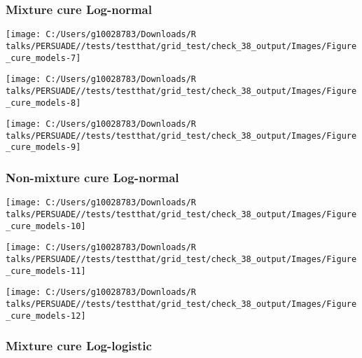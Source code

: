 \documentclass[
]{article}
\begin{document}
\subsubsection{Mixture cure Log-normal}\label{mixture-cure-log-normal}

\begin{flushleft}\texttt{[image: C:/Users/g10028783/Downloads/R talks/PERSUADE//tests/testthat/grid\_test/check\_38\_output/Images/Figure\_cure\_models-7]} \end{flushleft}

\begin{flushleft}\texttt{[image: C:/Users/g10028783/Downloads/R talks/PERSUADE//tests/testthat/grid\_test/check\_38\_output/Images/Figure\_cure\_models-8]} \end{flushleft}

\begin{flushleft}\texttt{[image: C:/Users/g10028783/Downloads/R talks/PERSUADE//tests/testthat/grid\_test/check\_38\_output/Images/Figure\_cure\_models-9]} \end{flushleft}

\clearpage

\subsubsection{Non-mixture cure
Log-normal}\label{non-mixture-cure-log-normal}

\begin{flushleft}\texttt{[image: C:/Users/g10028783/Downloads/R talks/PERSUADE//tests/testthat/grid\_test/check\_38\_output/Images/Figure\_cure\_models-10]} \end{flushleft}

\begin{flushleft}\texttt{[image: C:/Users/g10028783/Downloads/R talks/PERSUADE//tests/testthat/grid\_test/check\_38\_output/Images/Figure\_cure\_models-11]} \end{flushleft}

\begin{flushleft}\texttt{[image: C:/Users/g10028783/Downloads/R talks/PERSUADE//tests/testthat/grid\_test/check\_38\_output/Images/Figure\_cure\_models-12]} \end{flushleft}

\clearpage

\subsubsection{Mixture cure
Log-logistic}\label{mixture-cure-log-logistic}
\end{document}
